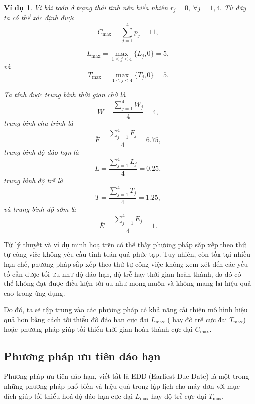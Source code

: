 \documentclass[12pt,a4paper]{report}
\newtheorem{vd}{Ví dụ}
\begin{document}
\begin{vd}
Vì bài toán ở trạng thái tĩnh nên hiển nhiên $r_j = 0, \: \forall j=\overline{1,4}$. Từ đây ta có thể xác định được
\begin{equation*}
C_{\max} = \sum_{j=1}^4 p_j = 11,
\end{equation*}

\begin{equation*}
	L_{\max} = \max _{1 \leq j \leq 4} \{L_j, 0\} = 5,
\end{equation*}
và
\begin{equation*}
	T_{\max} = \max _{1 \leq j \leq 4} \{T_j, 0\} = 5.
\end{equation*}

Ta tính được trung bình thời gian chờ là
\begin{equation*}
\overline{W} = \frac{\sum_{j=1}^4 W_j}{4} = 4,
\end{equation*}
trung bình chu trình là
\begin{equation*}
\overline{F} = \frac{\sum_{j=1}^4 F_j}{4} = 6.75,
\end{equation*}
trung bình độ đáo hạn là
\begin{equation*}
\overline{L} = \frac{\sum_{j=1}^4 L_j}{4} = 0.25,
\end{equation*}
trung bình độ trễ là
\begin{equation*}
\overline{T} = \frac{\sum_{j=1}^4 T_j}{4} = 1.25,
\end{equation*}
và trung bình độ sớm là
\begin{equation*}
\overline{E} = \frac{\sum_{j=1}^4 E_j}{4} = 1.
\end{equation*}
\end{vd}

Từ lý thuyết và ví dụ minh hoạ trên có thể thấy phương pháp sắp xếp theo thứ tự công việc không yêu cầu tính toán quá phức tạp. Tuy nhiên, còn tồn tại nhiều hạn chế, phương pháp sắp xếp theo thứ tự công việc không xem xét đến các yếu tố cần được tối ưu như độ đáo hạn, độ trễ hay thời gian hoàn thành, do đó có thể không đạt được điều kiện tối ưu như mong muốn và không mang lại hiệu quả cao trong ứng dụng.

Do đó, ta sẽ tập trung vào các phương pháp có khả năng cải thiện mô hình hiệu quả hơn bằng cách tối thiểu độ đáo hạn cực đại $L_{\max}$ ( hay độ trễ cực đại $T_{\max}$) hoặc phương pháp giúp tối thiểu thời gian hoàn thành cực đại $C_{\max}$.
\subsection{Phương pháp ưu tiên đáo hạn}
Phương pháp ưu tiên đáo hạn, viết tắt là EDD (Earliest Due Date) là một trong những phương pháp phổ biến và hiệu quả trong lập lịch cho máy đơn với mục đích giúp tối thiểu hoá độ đáo hạn cực đại $L_{\max}$ hay độ trễ cực đại $T_{\max}$.
\end{document}
